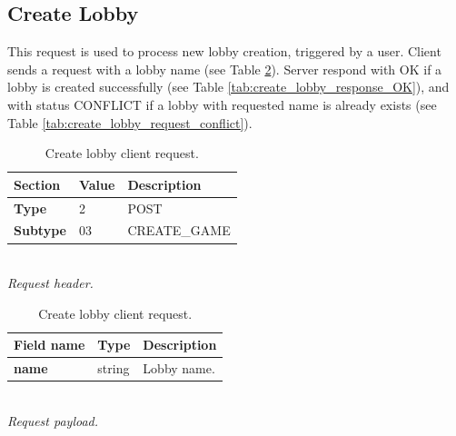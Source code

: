 \documentclass[english, sem, kiv, he, iso690alph, pdf, viewonly]{fasthesis}
\begin{document}
\newpage

\subsection{Create Lobby}

This request is used to process new lobby creation, triggered by a user. Client sends a request with a lobby name (see Table \ref{tab:create_lobby_request}). Server respond with OK if a lobby is created successfully (see Table \ref{tab:create_lobby_response_OK}), and with status CONFLICT if a lobby with requested name is already exists (see Table \ref{tab:create_lobby_request_conflict}).

\begin{table}[h!]
	\centering
	\begin{minipage}[b]{0.45\textwidth}
		\centering
		\begin{tabular}{|l|l|l|}
			\hline
			\textbf{Section} & \textbf{Value} & \textbf{Description} \\ \hline
			\textbf{Type} & 2 & \footnotesize{POST} \\ \hline
			\textbf{Subtype} & 03 & \footnotesize{CREATE\_GAME}  \\ \hline
		\end{tabular} \\
		\textit{Request header.}
	\end{minipage} 
	\hfill
	\begin{minipage}[b]{0.5\textwidth}
		\centering
		\begin{tabular}{|l|l|p{70pt}|}
			\hline
			\textbf{Field name} & \textbf{Type} & \textbf{Description} \\ \hline
			\textbf{name} & string & Lobby name. \\ \hline
		\end{tabular} \\
		\textit{Request payload.}
	\end{minipage}	
	\caption{Create lobby client request.}
	\label{tab:create_lobby_request}
\end{table}
\end{document}
